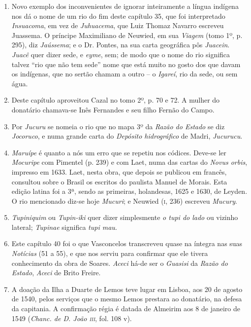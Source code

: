 \begin{enumerate}
\item Novo exemplo dos inconvenientes de ignorar inteiramente a língua indígena nos dá 
o nome de um rio do fim deste capítulo 35, que foi interpretado \textit{Insuacoma}, 
em vez de \textit{Juhuacema}, que Luiz Thomaz Navarro escreveu Juassema. O príncipe Maximiliano de 
Neuwied, em sua \textit{Viagem} (tomo 1º, p. 295), diz \textit{Jaússema}; e o Dr. Pontes, na sua carta 
geográfica pôs \textit{Juacein}. \textit{Juacê} quer dizer sede, e \textit{eyme}, sem; de modo que o nome do rio 
significa talvez ``rio que não tem sede''  nome que está muito no gosto dos que davam 
os indígenas, que no sertão chamam a outro -- o \textit{Igareí}, rio da sede, ou sem água.

\item Deste capítulo aproveitou Cazal no tomo 2º, p. 70 e 72. A mulher do donatário 
chamava-se Inês Fernandes e seu filho Fernão do Campo.

\item Por \textit{Jucuru} se nomeia o rio que no mapa 3º da \textit{Razão do Estado} se diz \textit{Jocoruco}, e 
numa grande carta do \textit{Depósito hidrográfico} de Madri, \textit{Jucurucu}.

\item \textit{Maruípe} é quanto a nós um erro que se repetiu nos códices. Deve-se ler \textit{Mocuripe} 
com Pimentel (p. 239) e com Laet, numa das cartas do \textit{Novus orbis}, impresso em 1633. 
Laet, nesta obra, que depois se publicou em francês, consultou sobre o Brasil os 
escritos do paulista Manuel de Morais. Esta edição latina foi a 3ª, sendo as primeiras, 
holandesas, 1625 e 1630, de Leyden. O rio mencionado diz-se hoje \textit{Mucuri}; e Neuwied 
(\textsc{i}, 236) escreveu \textit{Mucury}.

\item \textit{Tupiniquim} ou \textit{Tupin-iki} quer dizer simplesmente \textit{o tupi do lado} ou  vizinho lateral; 
\textit{Tupinae} significa \textit{tupi mau}.

\item  Este capítulo 40 foi o que Vasconcelos transcreveu quase na íntegra
nas suas \textit{Notícias} (51 a 55), e que nos serviu para confirmar que ele tivera conhecimento da obra
de Soares. \textit{Aceci} há-de ser o \textit{Guasisi} da \textit{Razão do Estado}, \textit{Aceci} 
de Brito Freire.

\item A doação da Ilha a Duarte de Lemos teve lugar em Lisboa, aos 20 de agosto de 
1540, pelos serviços que o mesmo Lemos prestara ao donatário, na defesa da capitania. 
A confirmação régia é datada de Almeirim aos 8 de janeiro de 1549 (\textit{Chanc. de D. 
João \textsc{iii}}, fol. 108 v).


\end{enumerate}
